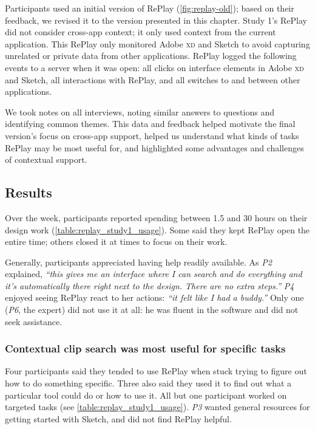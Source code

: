 Participants used an initial version of RePlay (\autoref{fig:replay-old}); based on their feedback, we revised it to the version presented in this chapter. Study 1's RePlay did not consider cross-app context; it only used context from the current application. This RePlay only monitored Adobe \textsc{xd} and Sketch to avoid capturing unrelated or private data from other applications. RePlay logged the following events to a server when it was open: all clicks on interface elements in Adobe \textsc{xd} and Sketch, all interactions with RePlay, and all switches to and between other applications.

We took notes on all interviews, noting similar answers to questions and identifying common themes. This data and feedback helped motivate the final version's focus on cross-app support, helped us understand what kinds of tasks RePlay may be most useful for, and highlighted some advantages and challenges of contextual support.

\subsection{Results}
Over the week, participants reported spending between 1.5 and 30 hours on their design work (\autoref{table:replay_study1_usage}). Some said they kept RePlay open the entire time; others closed it at times to focus on their work. 

Generally, participants appreciated having help readily available. As \textit{P2} explained, \textit{``this gives me an interface where I can search and do everything and it's automatically there right next to the design. There are no extra steps.''} \textit{P4} enjoyed seeing RePlay react to her actions: \textit{``it felt like I had a buddy.''} Only one (\textit{P6}, the expert) did not use it at all: he was fluent in the software and did not seek assistance.

\subsubsection{Contextual clip search was most useful for specific tasks}
Four participants said they tended to use RePlay when stuck trying to figure out how to do something specific. Three also said they used it to find out what a particular tool could do or how to use it. All but one participant worked on targeted tasks (see \autoref{table:replay_study1_usage}). \textit{P3} wanted general resources for getting started with Sketch, and did not find RePlay helpful.

